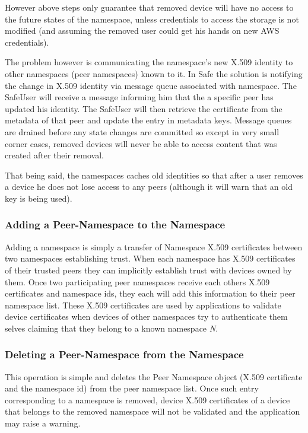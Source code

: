 However above steps only guarantee that removed device will have no access to the future states of the namespace, unless credentials to access the storage is not modified (and assuming the removed user could get his hands on new AWS credentials).

The problem however is communicating the namespace's new X.509 identity to other namespaces (peer namespaces) known to it. In Safe the solution is notifying the change in X.509 identity via message queue associated with namespace. The SafeUser will receive a message informing him that the a specific peer has updated his identity. The SafeUser will then retrieve the certificate from the metadata of that peer and update the entry in metadata keys.
Message queues are drained before any state changes are committed so except in very small corner cases, removed devices will never be able to access content that was created after their removal.

That being said, the namespaces caches old identities so that after a user removes a device he does not lose access to any peers (although it will warn that an old key is being used).

\subsubsection{Adding a Peer-Namespace to the Namespace}
Adding a namespace is simply a transfer of Namespace X.509 certificates between two namespaces establishing trust. When each namespace has X.509 certificates of their trusted peers they can implicitly establish trust with devices owned by them. Once two participating peer namespaces receive each others X.509 certificates and namespace ids, they each will add this information to their peer namespace list. These X.509 certificates are used by applications to validate device certificates when devices of other namespaces try to authenticate them selves claiming that they belong to a known namespace \textit{N}. 

\subsubsection{Deleting a Peer-Namespace from the Namespace}
This operation is simple and deletes the Peer Namespace object (X.509 certificate and the namespace id) from the peer namespace list. Once such entry corresponding to a namespace is removed,  device X.509 certificates of a device that belongs to the removed namespace will not be validated and the application may raise a warning.

